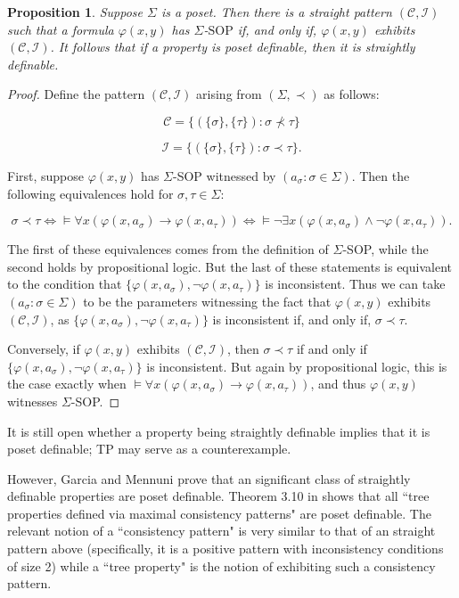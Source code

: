\documentclass{article}
\newcommand{\calC}{\mathcal{C}}
\newcommand{\calI}{\mathcal{I}}
\newcommand{\vphi}{\varphi}
\newtheorem{proposition}{Proposition}
\theoremstyle{definition}
\theoremstyle{definition}
\theoremstyle{definition}
\begin{document}
\begin{proposition}\label{poset implies straight}
    Suppose $\Sigma$ is a poset. Then there is a straight pattern $(\calC, \calI)$ such that a formula $\vphi(x,y)$ has $\Sigma$-$\mathrm{SOP}$ if, and only if, $\vphi(x,y)$ exhibits $(\calC, \calI)$. It follows that if a property is poset definable, then it is straightly definable.
\end{proposition}

\begin{proof}
    Define the pattern $(\calC,\calI)$ arising from $(\Sigma,\prec)$ as follows: 

    \[\calC=\{(\{\sigma\},\{\tau
    \})\colon \sigma\not\prec\tau\}\]
    
   \[\calI=\{(\{\sigma\},\{\tau\})\colon \sigma\prec\tau\}.\]

First, suppose $\vphi(x,y)$ has $\Sigma$-SOP witnessed by $(a_\sigma\colon \sigma\in \Sigma)$. Then the following equivalences hold for $\sigma,\tau\in\Sigma$:

\[\sigma\prec\tau\iff \models\forall x(\vphi(x,a_\sigma)\to\vphi(x,a_\tau))\iff\models \neg\exists x(\vphi(x, a_\sigma)\land\neg\vphi(x, a_\tau)).\]

The first of these equivalences comes from the definition of $\Sigma$-SOP, while the second holds by propositional logic. But the last of these statements is equivalent to the condition that $\{\vphi(x, a_\sigma),\neg\vphi(x,a_\tau)\}$ is inconsistent. Thus we can take $(a_\sigma\colon \sigma\in \Sigma)$ to be the parameters witnessing the fact that $\vphi(x,y)$ exhibits $(\calC,\calI)$, as  $\{\vphi(x, a_\sigma),\neg\vphi(x,a_\tau)\}$ is inconsistent if, and only if, $\sigma\prec\tau$. 

Conversely, if $\vphi(x,y)$ exhibits $(\calC,\calI)$, then $\sigma\prec\tau$ if and only if $\{\vphi(x, a_\sigma),\neg\vphi(x,a_\tau)\}$ is inconsistent. But again by propositional logic, this is the case exactly when $\models\forall x(\vphi(x,a_\sigma)\to\vphi(x,a_\tau))$, and thus $\vphi(x,y)$ witnesses $\Sigma$-SOP.
   
\end{proof}

It is still open whether a property being straightly definable implies that it is poset definable; TP may serve as a counterexample.

However, Garcia and Mennuni prove that an significant class of straightly definable properties are poset definable. Theorem 3.10 in \cite{garcia2022model} shows that all ``tree properties defined via maximal consistency patterns" are poset definable. The relevant notion of a ``consistency pattern" is very similar to that of an straight pattern above (specifically, it is a positive pattern with inconsistency conditions of size 2) while a   ``tree property" is the notion of exhibiting such a consistency pattern.
\end{document}
